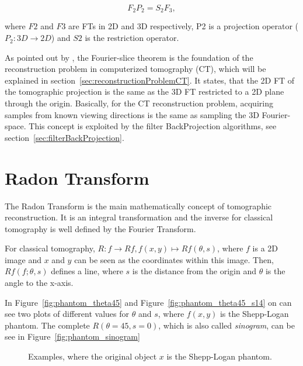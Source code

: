\begin{equation}
    \label{eq:Fourrier-slice}
    F_2 P_2 = S_2 F_3,
\end{equation}

where $F2$ and $F3$ are FTs in 2D and 3D respectively, P2 is a projection operator ($P_2 : 3D \rightarrow 2D$) and $S2$ is the restriction operator.

As pointed out by \cite{cryoEmMath},
the Fourier-slice theorem is the foundation of the reconstruction problem in computerized tomography (CT), which will be explained in section~\ref{sec:reconstructionProblemCT}.
It states, that the 2D FT of the tomographic projection is the same as the 3D FT restricted to a 2D plane through the origin.
Basically, for the CT reconstruction problem, acquiring samples from known viewing directions is the same 
as sampling the 3D Fourier-space. This concept is exploited by the filter BackProjection algorithms, see section~\ref{sec:filterBackProjection}.

\section{Radon Transform}
The Radon Transform\cite{radonTransform} is the main mathematically concept of tomographic reconstruction.
It is an integral transformation and the inverse for classical tomography is well defined by the Fourier Transform.

For classical tomography, $R: f \to Rf, f(x,y) \mapsto Rf(\theta, s)$, where $f$ is a 2D image and $x$ and $y$
can be seen as the coordinates within this image. Then, $Rf(f; \theta, s)$ defines a line, where $s$ is the distance 
from the origin and $\theta$ is the angle to the x-axis.

In Figure~\ref{fig:phantom_theta45} and Figure~\ref{fig:phantom_theta45_s14} on can see two plots of different
values for $\theta$ and $s$, where $f(x,y)$ is the Shepp-Logan phantom. The complete $R(\theta=45, s=0)$, 
which is also called \textit{sinogram}, can be see in Figure~\ref{fig:phantom_sinogram}

\begin{figure}[H]
    \centering
    \caption{Examples, where the original object $x$ is the Shepp-Logan phantom.}
\end{figure}